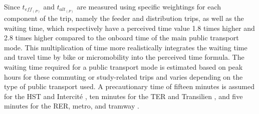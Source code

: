 \begin{refsegment}
Since \(t_{eff_{(P)}}\) and \(t_{alt_{(P)}}\) are measured using specific weightings for each component of the trip, namely the feeder and distribution trips, as well as the waiting time, which respectively have a perceived time value 1.8 times higher \textcolor{blue}{\autocite[110]{wardman_review_2001, gleave_transport_1997}} and 2.8 times higher \textcolor{blue}{\autocite[110]{horl_introducing_2021, wardman_review_2001}} compared to the onboard time of the main public transport mode. This multiplication of time more realistically integrates the waiting time and travel time by bike or micromobility into the perceived time formula. The waiting time required for a public transport mode is estimated based on peak hours for these commuting or study-related trips and varies depending on the type of public transport used. A precautionary time of fifteen minutes is assumed for the \acrshort{HST} and Intercité \textcolor{blue}{\autocite[12]{pagliara_high-speed_2012}}, ten minutes for the \acrshort{TER} and Transilien \textcolor{blue}{\autocite[300]{ingvardson_passenger_2018}}, and five minutes for the \acrshort{RER}, metro, and tramway \textcolor{blue}{\autocite[300]{hua_comprehensive_2018, ingvardson_passenger_2018}}.%


\end{refsegment}
